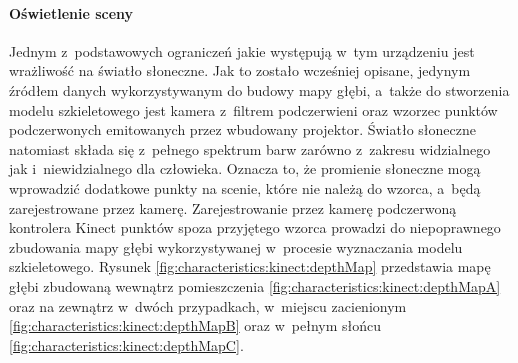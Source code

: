 \paragraph*{Oświetlenie sceny}
Jednym z~podstawowych ograniczeń jakie występują w~tym urządzeniu jest wrażliwość na światło słoneczne. Jak to zostało wcześniej opisane, jedynym źródłem danych wykorzystywanym do budowy mapy głębi, a~także do stworzenia modelu szkieletowego jest kamera z~filtrem podczerwieni oraz wzorzec punktów podczerwonych emitowanych przez wbudowany projektor. Światło słoneczne natomiast składa się z~pełnego spektrum barw zarówno z~zakresu widzialnego jak i~niewidzialnego dla człowieka. Oznacza to, że promienie słoneczne mogą wprowadzić dodatkowe punkty na scenie, które nie należą do wzorca, a~będą zarejestrowane przez kamerę. Zarejestrowanie przez kamerę podczerwoną kontrolera Kinect punktów spoza przyjętego wzorca prowadzi do niepoprawnego zbudowania mapy głębi wykorzystywanej w~procesie wyznaczania modelu szkieletowego. Rysunek \ref{fig:characteristics:kinect:depthMap} przedstawia mapę głębi zbudowaną wewnątrz pomieszczenia \ref{fig:characteristics:kinect:depthMapA} oraz na zewnątrz w~dwóch przypadkach, w~miejscu zacienionym \ref{fig:characteristics:kinect:depthMapB} oraz w~pełnym słońcu \ref{fig:characteristics:kinect:depthMapC}. 
		
